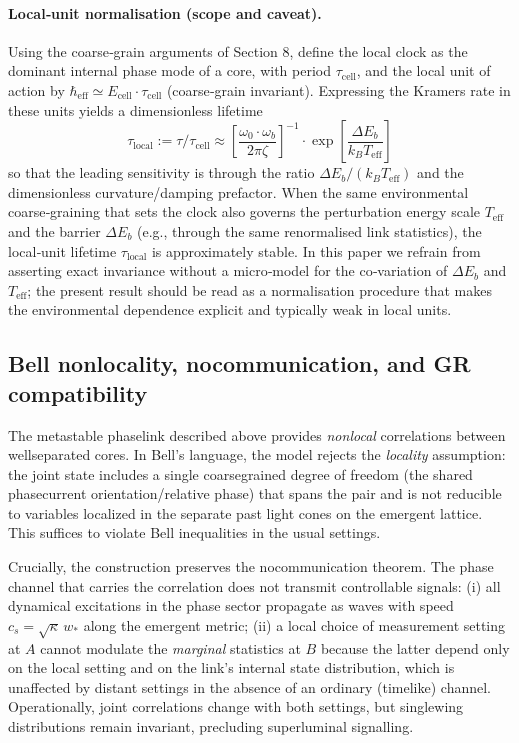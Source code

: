 \documentclass[11pt]{article}
\begin{document}
\paragraph{Local‑unit normalisation (scope and caveat).} Using the coarse‑grain arguments of Section 8, define the local clock as the dominant internal phase mode of a core, with period $\tau_{\text{cell}}$, and the local unit of action by $\hbar_{\mathrm{eff}} \simeq E_{\text{cell}} \cdot \tau_{\text{cell}}$ (coarse‑grain invariant). Expressing the Kramers rate in these units yields a dimensionless lifetime
\begin{equation}
\tau_{\text{local}} := \tau / \tau_{\text{cell}} \approx \left[ \frac{\omega_0 \cdot \omega_b}{2\pi \zeta} \right]^{-1} \cdot \exp\left[ \frac{\Delta E_b}{k_B T_{\text{eff}}} \right]
\end{equation}
so that the leading sensitivity is through the ratio $\Delta E_b/(k_B T_{\text{eff}})$ and the dimensionless curvature/damping prefactor. When the same environmental coarse‑graining that sets the clock also governs the perturbation energy scale $T_{\text{eff}}$ and the barrier $\Delta E_b$ (e.g., through the same renormalised link statistics), the local‑unit lifetime $\tau_{\text{local}}$ is approximately stable. In this paper we refrain from asserting exact invariance without a micro‑model for the co‑variation of $\Delta E_b$ and $T_{\text{eff}}$; the present result should be read as a normalisation procedure that makes the environmental dependence explicit and typically weak in local units.

\subsection{Bell nonlocality, no\textendash communication, and GR compatibility}

The metastable phase\textendash link described above provides \emph{nonlocal} correlations between well\textendash separated cores. In Bell's language, the model rejects the \emph{locality} assumption: the joint state includes a single coarse\textendash grained degree of freedom (the shared phase\textendash current orientation/relative phase) that spans the pair and is not reducible to variables localized in the separate past light cones on the emergent lattice. This suffices to violate Bell inequalities in the usual settings.

Crucially, the construction preserves the no\textendash communication theorem. The phase channel that carries the correlation does not transmit controllable signals: (i) all dynamical excitations in the phase sector propagate as waves with speed $c_s=\sqrt{\kappa}\,w_*$ along the emergent metric; (ii) a local choice of measurement setting at $A$ cannot modulate the \emph{marginal} statistics at $B$ because the latter depend only on the local setting and on the link's internal state distribution, which is unaffected by distant settings in the absence of an ordinary (timelike) channel. Operationally, joint correlations change with both settings, but single\textendash wing distributions remain invariant, precluding superluminal signalling.
\end{document}
